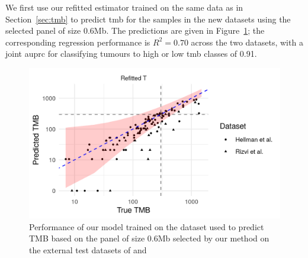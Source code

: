 \documentclass[../thesis.tex]{subfiles}
\begin{document}
{We first use our refitted estimator trained on the same data as in Section~\ref{sec:tmb} to predict \gls{tmb} for the samples in the new datasets using the selected panel of size 0.6Mb. The predictions are given in Figure~\ref{fig:externalTMB}; the corresponding regression performance is {$R^2 = 0.70$ across the two datasets, with a joint \gls{auprc} for classifying tumours to high or low \gls{tmb} classes of 0.91.}}

\begin{figure}
    \centering
    \includegraphics[width=5in]{../figures/chapter3/nsclc_val_pred.png}
    \caption{{Performance of our model trained on the \citet{campbell_distinct_2016} dataset used to predict TMB based on the panel of size 0.6Mb selected by our method on the external test datasets of \citet{hellmann_genomic_2018} and \citet{rizvi_mutational_2015}}}
    \label{fig:externalTMB}
\end{figure}
\end{document}
